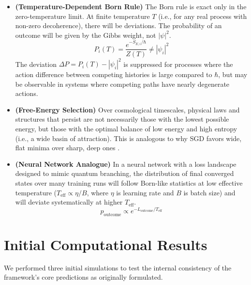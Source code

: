 \documentclass[aps,prl,twocolumn,superscriptaddress,longbibliography]{revtex4-2}
\begin{document}
\begin{itemize}
    \item[\textbf{P1}] \textbf{(Temperature-Dependent Born Rule)} The Born rule is exact only in the zero-temperature limit. At finite temperature $T$ (i.e., for any real process with non-zero decoherence), there will be deviations. The probability of an outcome will be given by the Gibbs weight, not $|\psi|^2$.
    \begin{equation}
        P_i(T) = \frac{e^{-S_{E,i}/\hbar}}{Z(T)} \neq |\psi_i|^2
        \label{eq:p1}
    \end{equation}
    The deviation $\Delta P = P_i(T) - |\psi_i|^2$ is suppressed for processes where the action difference between competing histories is large compared to $\hbar$, but may be observable in systems where competing paths have nearly degenerate actions.

    \item[\textbf{P2}] \textbf{(Free-Energy Selection)} Over cosmological timescales, physical laws and structures that persist are not necessarily those with the lowest possible energy, but those with the optimal balance of low energy and high entropy (i.e., a wide basin of attraction). This is analogous to why SGD favors wide, flat minima over sharp, deep ones \cite{Hochreiter1997}.

    \item[\textbf{P3}] \textbf{(Neural Network Analogue)} In a neural network with a loss landscape designed to mimic quantum branching, the distribution of final converged states over many training runs will follow Born-like statistics at low effective temperature ($T_{\text{eff}} \propto \eta/B$, where $\eta$ is learning rate and $B$ is batch size) and will deviate systematically at higher $T_{\text{eff}}$.
    \begin{equation}
        p_{\text{outcome}} \propto e^{-L_{\text{outcome}}/T_{\text{eff}}}
        \label{eq:p3}
    \end{equation}
\end{itemize}

\section{Initial Computational Results}

We performed three initial simulations to test the internal consistency of the framework's core predictions as originally formulated.
\end{document}
